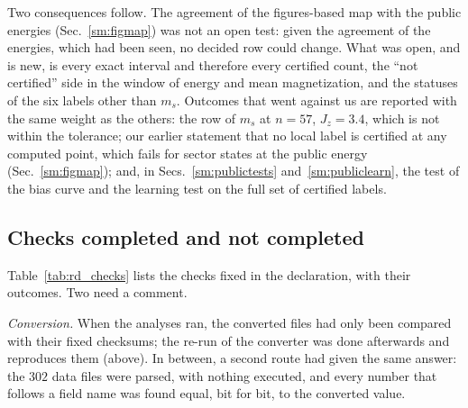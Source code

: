 \documentclass[aps,prx,onecolumn,10pt,nofootinbib,longbibliography,floatfix]{revtex4-2}
\theoremstyle{remark}
\newcommand{\Jz}{J_z}
\newcommand{\ms}{m_s}
\begin{document}
Two consequences follow. The agreement of the figures-based map with the public energies
(Sec.~\ref{sm:figmap}) was not an open test: given the agreement of the energies, which had been seen, no decided
row could change. What was open, and is new, is every exact interval and therefore every certified count, the
``not certified'' side in the window of energy and mean magnetization, and the statuses of the six labels other
than $\ms$. Outcomes that went against us are reported with the same weight as the others: the row of $\ms$ at
$n=57$, $\Jz=3.4$, which is not within the tolerance; our earlier statement that no local label is certified at any computed
point, which fails for sector states at the public energy (Sec.~\ref{sm:figmap}); and, in
Secs.~\ref{sm:publictests} and~\ref{sm:publiclearn}, the test of the bias curve and the learning test on the full
set of certified labels.

\subsection{Checks completed and not completed}
\label{sm:public_checks}
Table~\ref{tab:rd_checks} lists the checks fixed in the declaration, with their outcomes. Two need a comment.

\emph{Conversion.} When the analyses ran, the converted files had only been compared with their fixed checksums; the
re-run of the converter was done afterwards and reproduces them (above). In between, a second route had given the
same answer: the $302$ data files were parsed, with nothing executed, and every number that follows a field name %
was found equal, bit for bit, to the converted value.
\end{document}
